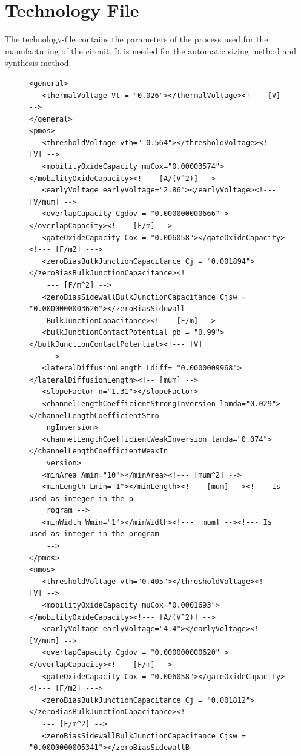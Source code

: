 \section{Technology File}\label{sec:inputFileTechnologyFile}
The technology-file contains the parameters of the process used for the manufacturing of the circuit. It is needed for the automatic sizing method and synthesis method.

\begin{figure}[H]
	\begin{lstlisting}[basicstyle=\ttfamily\scriptsize,backgroundcolor={\color{gray!30}}, escapechar=? ]
<general>
   <thermalVoltage Vt = "0.026"></thermalVoltage><!--- [V] -->
</general>
<pmos>
   <thresholdVoltage vth="-0.564"></thresholdVoltage><!--- [V] -->
   <mobilityOxideCapacity muCox="0.00003574"></mobilityOxideCapacity><!--- [A/(V^2)] -->
   <earlyVoltage earlyVoltage="2.86"></earlyVoltage><!--- [V/mum] -->
   <overlapCapacity Cgdov = "0.000000000666" ></overlapCapacity><!--- [F/m] -->
   <gateOxideCapacity Cox = "0.006058"></gateOxideCapacity><!--- [F/m2] --->
   <zeroBiasBulkJunctionCapacitance Cj = "0.001894"></zeroBiasBulkJunctionCapacitance><!
    --- [F/m^2] -->
   <zeroBiasSidewallBulkJunctionCapacitance Cjsw = "0.0000000003626"></zeroBiasSidewall
    BulkJunctionCapacitance><!--- [F/m] -->
   <bulkJunctionContactPotential pb = "0.99"></bulkJunctionContactPotential><!--- [V] 
    -->
   <lateralDiffusionLength Ldiff= "0.0000009968"></lateralDiffusionLength><!-- [mum] -->
   <slopeFactor n="1.31"></slopeFactor>
   <channelLengthCoefficientStrongInversion lamda="0.029"></channelLengthCoefficientStro
    ngInversion>
   <channelLengthCoefficientWeakInversion lamda="0.074"></channelLengthCoefficientWeakIn
    version>
   <minArea Amin="10"></minArea><!--- [mum^2] -->
   <minLength Lmin="1"></minLength><!--- [mum] --><!--- Is used as integer in the p
    rogram -->
   <minWidth Wmin="1"></minWidth><!--- [mum] --><!--- Is used as integer in the program 
    -->
</pmos>
<nmos>
   <thresholdVoltage vth="0.405"></thresholdVoltage><!--- [V] -->
   <mobilityOxideCapacity muCox="0.0001693"></mobilityOxideCapacity><!--- [A/(V^2)] -->
   <earlyVoltage earlyVoltage="4.4"></earlyVoltage><!--- [V/mum] -->
   <overlapCapacity Cgdov = "0.000000000620" ></overlapCapacity><!--- [F/m] -->
   <gateOxideCapacity Cox = "0.006058"></gateOxideCapacity><!--- [F/m2] --->
   <zeroBiasBulkJunctionCapacitance Cj = "0.001812"></zeroBiasBulkJunctionCapacitance><!
   --- [F/m^2] -->
   <zeroBiasSidewallBulkJunctionCapacitance Cjsw = "0.0000000005341"></zeroBiasSidewallB

\end{lstlisting}
\end{figure}
